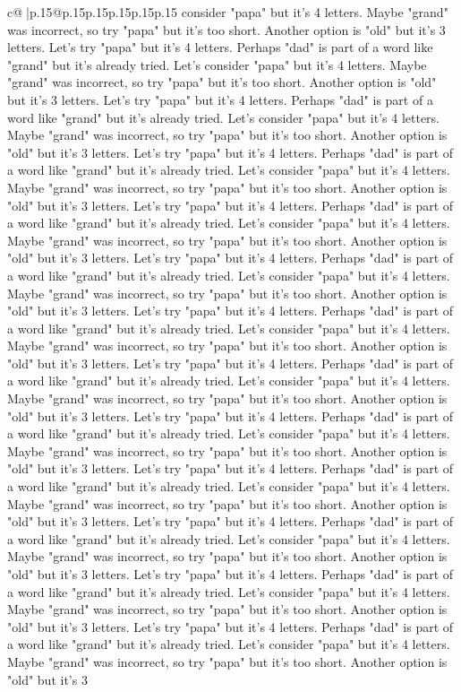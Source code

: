 \documentclass{article}
\begin{document}
{\begin{supertabular}{c@{$\;$}|p{.15\linewidth}@{}p{.15\linewidth}p{.15\linewidth}p{.15\linewidth}p{.15\linewidth}p{.15\linewidth}}
{{{consider "papa" but it's 4 letters. Maybe "grand" was incorrect, so try "papa" but it's too short. Another option is "old" but it's 3 letters. Let's try "papa" but it's 4 letters. Perhaps "dad" is part of a word like "grand" but it's already tried. Let's consider "papa" but it's 4 letters. Maybe "grand" was incorrect, so try "papa" but it's too short. Another option is "old" but it's 3 letters. Let's try "papa" but it's 4 letters. Perhaps "dad" is part of a word like "grand" but it's already tried. Let's consider "papa" but it's 4 letters. Maybe "grand" was incorrect, so try "papa" but it's too short. Another option is "old" but it's 3 letters. Let's try "papa" but it's 4 letters. Perhaps "dad" is part of a word like "grand" but it's already tried. Let's consider "papa" but it's 4 letters. Maybe "grand" was incorrect, so try "papa" but it's too short. Another option is "old" but it's 3 letters. Let's try "papa" but it's 4 letters. Perhaps "dad" is part of a word like "grand" but it's already tried. Let's consider "papa" but it's 4 letters. Maybe "grand" was incorrect, so try "papa" but it's too short. Another option is "old" but it's 3 letters. Let's try "papa" but it's 4 letters. Perhaps "dad" is part of a word like "grand" but it's already tried. Let's consider "papa" but it's 4 letters. Maybe "grand" was incorrect, so try "papa" but it's too short. Another option is "old" but it's 3 letters. Let's try "papa" but it's 4 letters. Perhaps "dad" is part of a word like "grand" but it's already tried. Let's consider "papa" but it's 4 letters. Maybe "grand" was incorrect, so try "papa" but it's too short. Another option is "old" but it's 3 letters. Let's try "papa" but it's 4 letters. Perhaps "dad" is part of a word like "grand" but it's already tried. Let's consider "papa" but it's 4 letters. Maybe "grand" was incorrect, so try "papa" but it's too short. Another option is "old" but it's 3 letters. Let's try "papa" but it's 4 letters. Perhaps "dad" is part of a word like "grand" but it's already tried. Let's consider "papa" but it's 4 letters. Maybe "grand" was incorrect, so try "papa" but it's too short. Another option is "old" but it's 3 letters. Let's try "papa" but it's 4 letters. Perhaps "dad" is part of a word like "grand" but it's already tried. Let's consider "papa" but it's 4 letters. Maybe "grand" was incorrect, so try "papa" but it's too short. Another option is "old" but it's 3 letters. Let's try "papa" but it's 4 letters. Perhaps "dad" is part of a word like "grand" but it's already tried. Let's consider "papa" but it's 4 letters. Maybe "grand" was incorrect, so try "papa" but it's too short. Another option is "old" but it's 3 letters. Let's try "papa" but it's 4 letters. Perhaps "dad" is part of a word like "grand" but it's already tried. Let's consider "papa" but it's 4 letters. Maybe "grand" was incorrect, so try "papa" but it's too short. Another option is "old" but it's 3 letters. Let's try "papa" but it's 4 letters. Perhaps "dad" is part of a word like "grand" but it's already tried. Let's consider "papa" but it's 4 letters. Maybe "grand" was incorrect, so try "papa" but it's too short. Another option is "old" but it's 3 }}}
\end{supertabular}}
\end{document}
